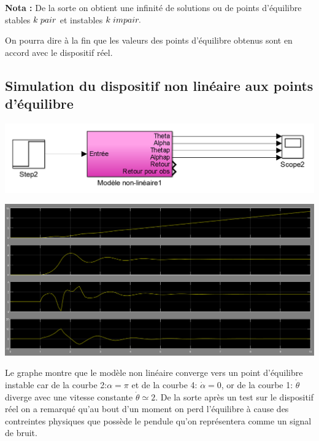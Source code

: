 \documentclass[12pt, a4paper, openany]{report}
\begin{document}
\textbf{Nota :} De la sorte on obtient une infinité de solutions ou de points d'équilibre stables $k  \hspace{1mm} pair $ et instables $k \hspace{1mm} impair.$

On pourra dire à la fin que les valeurs des points d'équilibre obtenus sont en accord avec le dispositif réel.

   \subsection{Simulation du dispositif non linéaire aux points d'équilibre}
 
  
\begin{center}
\includegraphics[scale=0.5]{modelenonlineairesimulink.png}
\label{fig3} 
\end{center} 
 
\begin{center}
\includegraphics[scale=0.4]{modelenonlin1.PNG}
\label{fig4} 
\end{center} 
 
 Le graphe montre que le modèle non linéaire converge vers un point d'équilibre instable car de la courbe 2:$\alpha = \pi$ et de la courbe 4: $\dot{\alpha}=0$, or  de la courbe 1: $\dot{\theta}$ diverge avec une vitesse constante $\dot{\theta} \simeq 2.$ De la sorte après un test sur le dispositif réel on a remarqué qu'au bout d'un moment on perd l'équilibre à cause des contreintes physiques que possède le pendule qu'on représentera comme un signal de bruit. 
\end{document}
